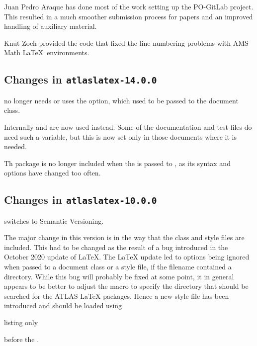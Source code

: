 Juan Pedro Araque has done most of the work setting up the PO-GitLab project.
This resulted in a much smoother submission process for papers and
an improved handling of auxiliary material.

Knut Zoch provided the code that fixed the line numbering problems with AMS Math \LaTeX\ environments.


\subsection{Changes in \texttt{atlaslatex-14.0.0}}
\label{sec:atlaslatex14}

 no longer needs or uses the  option,
which used to be passed to the document class.

Internally  and  are now used instead.
Some of the documentation and test files do need such a variable,
but this is now set only in those documents where it is needed.

Th package  is no longer included when the 
is passed to , as its syntax and options have changed too often.


\subsection{Changes in \texttt{atlaslatex-10.0.0}}
\label{sec:atlaslatex10}

 switches to Semantic Versioning.

The major change in this version is in the way that the class and style files are included.
This had to be changed as the result of a bug introduced in the October 2020 update of \LaTeX.
The \LaTeX{} update led to options being ignored when passed to a document class or a style file,
if the filename contained a directory.
While this bug will probably be fixed at some point,
it in general appears to be better to adjust the macro 
to specify the directory that should be searched for the ATLAS \LaTeX{} packages.
Hence a new style file  has been introduced and should be loaded using
\begin{tcblisting}{listing only}
\RequirePackage{latex/atlaslatexpath}
\end{tcblisting}
before the .

